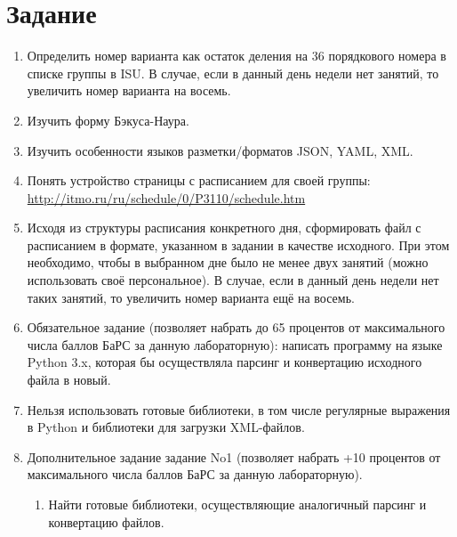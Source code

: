 



\itmo[
      variant=18,
      labn=4,
      discipline=Информатика,
      group=P3115,
      student=Владимир Мацюк,
      teacher=Малышева Татьяна Алексеевна
]

\tableofcontents

\section{Задание}
\begin{enumerate}
      \item Определить номер варианта как остаток деления на 36 порядкового
            номера в списке группы в ISU. В случае, если в данный день недели
            нет занятий, то увеличить номер варианта на восемь.
      \item  Изучить форму Бэкуса-Наура.
      \item  Изучить особенности языков разметки/форматов JSON, YAML, XML.
      \item  Понять устройство страницы с расписанием для своей группы:
            \url{http://itmo.ru/ru/schedule/0/P3110/schedule.htm}
      \item  Исходя из структуры расписания конкретного дня, сформировать
            файл с расписанием в формате, указанном в задании в качестве
            исходного. При этом необходимо, чтобы в выбранном дне было не
            менее двух занятий (можно использовать своё персональное). В
            случае, если в данный день недели нет таких занятий, то увеличить
            номер варианта ещё на восемь.
      \item  Обязательное задание (позволяет набрать до 65 процентов от
            максимального числа баллов БаРС за данную лабораторную):
            написать программу на языке Python 3.x, которая бы осуществляла
            парсинг и конвертацию исходного файла в новый.
      \item  Нельзя использовать готовые библиотеки, в том числе регулярные
            выражения в Python и библиотеки для загрузки XML-файлов.
      \item  Дополнительное задание задание No1 (позволяет набрать +10
            процентов от максимального числа баллов БаРС за данную
            лабораторную).
            \begin{enumerate}
                  \item Найти готовые библиотеки, осуществляющие аналогичный
                        парсинг и конвертацию файлов.

\end{enumerate}
\end{enumerate}
